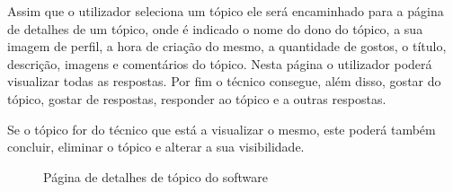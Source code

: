 Assim que o utilizador seleciona um tópico ele será encaminhado para a página de detalhes de um tópico, onde 
é indicado o nome do dono do tópico, a sua imagem de perfil, a hora de criação do mesmo, a quantidade de 
gostos, o título, descrição, imagens e comentários do tópico. Nesta página o utilizador poderá visualizar 
todas as respostas. 
Por fim o técnico consegue, além disso, gostar do tópico, gostar de respostas, responder ao tópico e a outras respostas.

Se o tópico for do técnico que está a visualizar o mesmo, este poderá também concluir, eliminar o tópico e alterar 
a sua visibilidade.

\begin{figure}[htb]%
    \centering
    \qquad
    \caption{Página de detalhes de tópico do software}%
    \label{fig:20}%
\end{figure}

